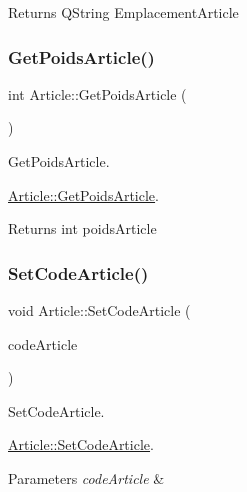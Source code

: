 \begin{DoxyReturn}{Returns}
Q\+String Emplacement\+Article


\end{DoxyReturn}
\mbox{\label{class_article_a0509109984e6d86e783c457ce70d13a7}} 
\subsubsection{\texorpdfstring{Get\+Poids\+Article()}{GetPoidsArticle()}}
{\footnotesize\ttfamily int Article\+::\+Get\+Poids\+Article (\begin{DoxyParamCaption}{ }\end{DoxyParamCaption})}



Get\+Poids\+Article. 

\mbox{\hyperlink{class_article_a0509109984e6d86e783c457ce70d13a7}{Article\+::\+Get\+Poids\+Article}}.

\begin{DoxyReturn}{Returns}
int poids\+Article


\end{DoxyReturn}
\mbox{\label{class_article_a5300f5a6247dd931cb411d7ff1721d7f}} 
\subsubsection{\texorpdfstring{Set\+Code\+Article()}{SetCodeArticle()}}
{\footnotesize\ttfamily void Article\+::\+Set\+Code\+Article (\begin{DoxyParamCaption}\item[{Q\+String}]{code\+Article }\end{DoxyParamCaption})}



Set\+Code\+Article. 

\mbox{\hyperlink{class_article_a5300f5a6247dd931cb411d7ff1721d7f}{Article\+::\+Set\+Code\+Article}}.


\begin{DoxyParams}{Parameters}
{\em code\+Article} & \\
\hline
\end{DoxyParams}
\mbox{\label{class_article_a6ee68c7584a20323039ab5065c34eb81}} 
